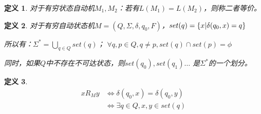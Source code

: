 \documentclass{ctexart}
\newtheorem{definition}{定义}[section]
\DeclarePairedDelimiter{\set}{\{}{\}}
\begin{document}
\begin{definition}
    对于有穷状态自动机$M_1, M_2$：若有$L(M_1) = L(M_2)$，则称二者等价。
\end{definition}

\begin{definition}
    对于有穷自动状态机$M = (Q, \Sigma, \delta, q_0, F)$，$set(q) = 
    \set*{x | \delta(q_0, x) = q}$

    所以有：$\Sigma^* = \bigcup_{q \in Q}set(q)$；
    $\forall q,p \in Q, q \ne p, set(q) \cap set(p) = \phi $

    同时，如果$Q$中不存在不可达状态，则$set(q_0), set(q_1) \dots$
    是$\Sigma^*$的一个划分。
\end{definition}

\begin{definition}
    \begin{align*}
        x R_M y & \iff \delta(q_0, x) = \delta(q_0, y) \\
            & \iff \exists q \in Q, x, y \in set(q)
    \end{align*}
\end{definition}
\end{document}
